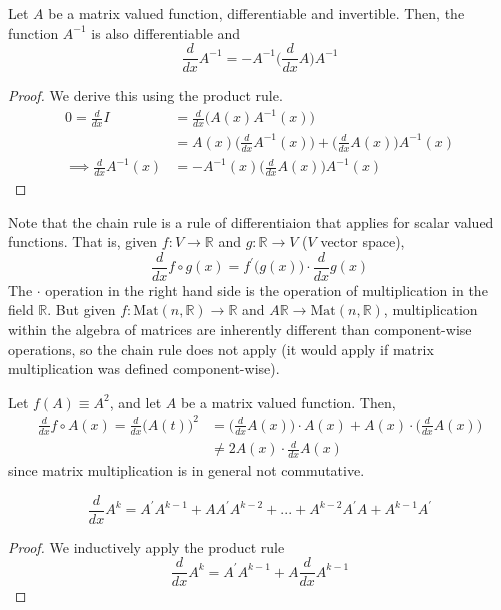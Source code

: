   \begin{theorem}
  Let $A$ be a matrix valued function, differentiable and invertible. Then, the function $A^{-1}$ is also differentiable and 
  \[\frac{d}{d x} A^{-1} = - A^{-1} \bigg( \frac{d}{d x} A \bigg) A^{-1}\]
  \end{theorem}
  \begin{proof}
  We derive this using the product rule. 
  \begin{align*}
      0 = \frac{d}{d x} I & = \frac{d}{d x} \big( A(x) A^{-1} (x) \big) \\
      & = A(x) \bigg(\frac{d}{d x} A^{-1} (x) \bigg) + \bigg( \frac{d}{d x} A(x) \bigg) A^{-1} (x) \\
      \implies \frac{d}{d x} A^{-1} (x) & = - A^{-1} (x) \bigg( \frac{d}{d x} A(x) \bigg) A^{-1}(x)
  \end{align*}
  \end{proof}
  Note that the chain rule is a rule of differentiaion that applies for scalar valued functions. That is, given $f: V \longrightarrow \mathbb{R}$ and $g: \mathbb{R} \longrightarrow V$ ($V$ vector space), 
  \[\frac{d}{d x} f \circ g (x) = f^\prime \big( g(x) \big) \cdot \frac{d}{d x} g(x)\]
  The $\cdot$ operation in the right hand side is the operation of multiplication in the field $\mathbb{R}$. But given $f: \text{Mat}(n, \mathbb{R}) \longrightarrow \mathbb{R}$ and $A \mathbb{R} \longrightarrow \text{Mat}(n, \mathbb{R})$, multiplication within the algebra of matrices are inherently different than component-wise operations, so the chain rule does not apply (it would apply if matrix multiplication was defined component-wise). 

  \begin{example}
  Let $f(A) \equiv A^2$, and let $A$ be a matrix valued function. Then, 
  \begin{align*}
      \frac{d}{d x} f \circ A(x) = \frac{d}{d x} \big( A(t) \big)^2 & = \bigg( \frac{d}{d x} A(x) \bigg) \cdot A(x) + A(x) \cdot \bigg( \frac{d}{d x} A(x) \bigg) \\
      & \neq 2 A(x) \cdot \frac{d}{d x} A(x)
  \end{align*}
  since matrix multiplication is in general not commutative. 
  \end{example}

  \begin{proposition}
  \[\frac{d}{d x} A^k = A^\prime A^{k-1} + A A^\prime A^{k-2} + ... + A^{k-2} A^\prime A + A^{k-1} A^\prime\]
  \end{proposition}
  \begin{proof}
  We inductively apply the product rule
  \[\frac{d}{d x} A^k = A^\prime A^{k-1} + A \frac{d}{d x} A^{k-1}\]
  \end{proof}

